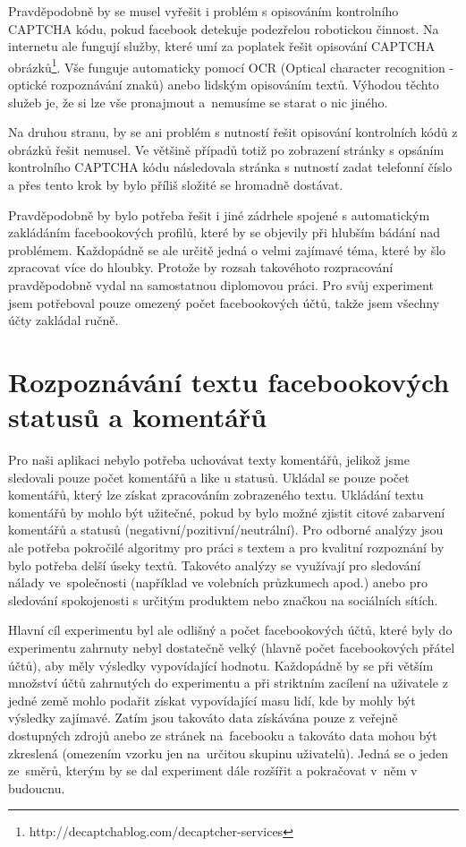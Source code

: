 \documentclass[thesis=M,czech]{FITthesis}[2013/05/10]
\begin{document}
Pravděpodobně by se musel vyřešit i problém s opisováním kontrolního CAPTCHA kódu, pokud facebook detekuje podezřelou robotickou činnost. Na internetu ale fungují služby, které umí za poplatek řešit opisování CAPTCHA obrázků\footnote{http://decaptchablog.com/decaptcher-services}. Vše funguje automaticky pomocí OCR (Optical character recognition - optické rozpoznávání znaků) anebo lidským opisováním textů. Výhodou těchto služeb je, že si lze vše pronajmout a~nemusíme se starat o nic jiného. 

Na druhou stranu, by se ani problém s nutností řešit opisování kontrolních kódů z obrázků řešit nemusel. Ve většině případů totiž po zobrazení stránky s opsáním kontrolního CAPTCHA kódu následovala stránka s nutností zadat telefonní číslo a přes tento krok by bylo příliš složité se hromadně dostávat.

Pravděpodobně by bylo potřeba řešit i jiné zádrhele spojené s automatickým zakládáním facebookových profilů, které by se objevily při hlubším bádání nad problémem. Každopádně se ale určitě jedná o velmi zajímavé téma, které by šlo zpracovat více do hloubky. Protože by rozsah takovéhoto rozpracování pravděpodobně vydal na samostatnou diplomovou práci. Pro svůj experiment jsem potřeboval pouze omezený počet facebookových účtů, takže jsem všechny účty zakládal ručně.

\section{Rozpoznávání textu facebookových statusů a komentářů}

Pro naši aplikaci nebylo potřeba uchovávat texty komentářů, jelikož jsme sledovali pouze počet komentářů a like u statusů. Ukládal se pouze počet komentářů, který lze získat zpracováním zobrazeného textu. Ukládání textu komentářů by mohlo být užitečné, pokud by bylo možné zjistit citové zabarvení komentářů a statusů (negativní/pozitivní/neutrální). Pro odborné analýzy jsou ale potřeba pokročilé algoritmy pro práci s textem a pro kvalitní rozpoznání by bylo potřeba delší úseky textů. Takovéto analýzy se využívají pro sledování nálady ve~společnosti (například ve volebních průzkumech apod.) anebo pro sledování spokojenosti s určitým produktem nebo značkou na sociálních sítích. 

Hlavní cíl experimentu byl ale odlišný a počet facebookových účtů, které byly do experimentu zahrnuty nebyl dostatečně velký (hlavně počet facebookových přátel účtů), aby měly výsledky vypovídající hodnotu. Každopádně by se při větším množství účtů zahrnutých do experimentu a při striktním zacílení na uživatele z jedné země mohlo podařit získat vypovídající masu lidí, kde by mohly být výsledky zajímavé. Zatím jsou takováto data získávána pouze z veřejně dostupných zdrojů anebo ze stránek na~facebooku a takováto data mohou být zkreslená (omezením vzorku jen na~určitou skupinu uživatelů). Jedná se o jeden ze~směrů, kterým by se dal experiment dále rozšířit a pokračovat v~něm v budoucnu.
\end{document}
